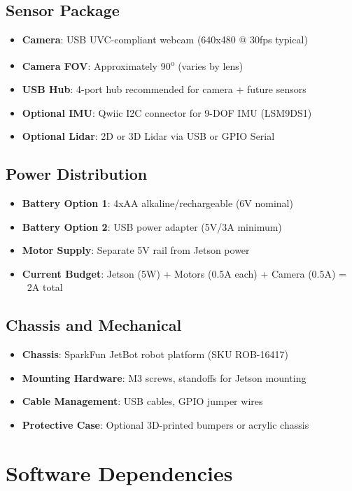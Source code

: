 \subsection{Sensor Package}
\begin{itemize}
    \item \textbf{Camera}: USB UVC-compliant webcam (640x480 @ 30fps typical)
    \item \textbf{Camera FOV}: Approximately 90\textsuperscript{o} (varies by lens)
    \item \textbf{USB Hub}: 4-port hub recommended for camera + future sensors
    \item \textbf{Optional IMU}: Qwiic I2C connector for 9-DOF IMU (LSM9DS1)
    \item \textbf{Optional Lidar}: 2D or 3D Lidar via USB or GPIO Serial
\end{itemize}

\subsection{Power Distribution}
\begin{itemize}
    \item \textbf{Battery Option 1}: 4xAA alkaline/rechargeable (6V nominal)
    \item \textbf{Battery Option 2}: USB power adapter (5V/3A minimum)
    \item \textbf{Motor Supply}: Separate 5V rail from Jetson power
    \item \textbf{Current Budget}: Jetson (5W) + Motors (0.5A each) + Camera (0.5A) = ~2A total
\end{itemize}

\subsection{Chassis and Mechanical}
\begin{itemize}
    \item \textbf{Chassis}: SparkFun JetBot robot platform (SKU ROB-16417)
    \item \textbf{Mounting Hardware}: M3 screws, standoffs for Jetson mounting
    \item \textbf{Cable Management}: USB cables, GPIO jumper wires
    \item \textbf{Protective Case}: Optional 3D-printed bumpers or acrylic chassis
\end{itemize}

\section{Software Dependencies}

